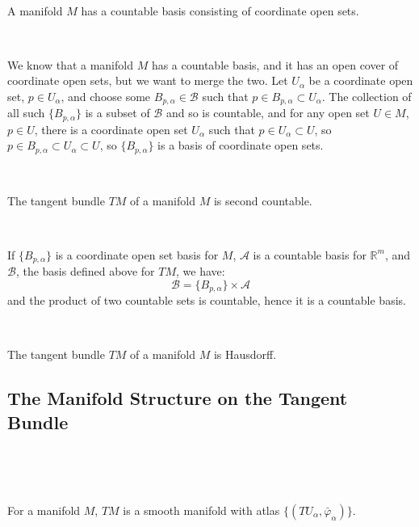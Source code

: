 \documentclass{article}
\begin{document}
\begin{lemma}
  \

  A manifold $M$ has a countable basis consisting of coordinate open sets.
\end{lemma}

\begin{customproof}
  \

  We know that a manifold $M$ has a countable basis, and it has an open cover of coordinate open sets, but we want to merge the two. Let $U_\alpha$ be a coordinate open set, $p \in U_\alpha$, and choose some $B_{p, \alpha} \in \mathcal{B}$ such that $p \in B_{p,\alpha} \subset U_\alpha$. The collection of all such $\{B_{p, \alpha}\}$ is a subset of $\mathcal{B}$ and so is countable, and for any open set $U \in M$, $p \in U$, there is a coordinate open set $U_\alpha$ such that $p \in U_\alpha \subset U$, so $p \in B_{p,\alpha} \subset U_\alpha \subset U$, so $\{B_{p,\alpha}\}$ is a basis of coordinate open sets.
\end{customproof}

\begin{proposition}
  \

  The tangent bundle $TM$ of a manifold $M$ is second countable.
\end{proposition}

\begin{customproof}
  \

  If $\{B_{p,\alpha}\}$ is a coordinate open set basis for $M$, $\mathcal{A}$ is a countable basis for $\mathbb{R}^m$, and $\mathcal{B}$, the basis defined above for $TM$, we have: $$\mathcal{B} = \{B_{p,\alpha}\} \times \mathcal{A}$$and the product of two countable sets is countable, hence it is a countable basis.
\end{customproof}

\begin{proposition}
  \

  The tangent bundle $TM$ of a manifold $M$ is Hausdorff.
\end{proposition}

\subsection{The Manifold Structure on the Tangent Bundle}
\

\begin{theorem}
  \

  For a manifold $M$, $TM$ is a smooth manifold with atlas $\{(TU_\alpha, \bar{\varphi}_\alpha)\}$.
\end{theorem}
\end{document}
